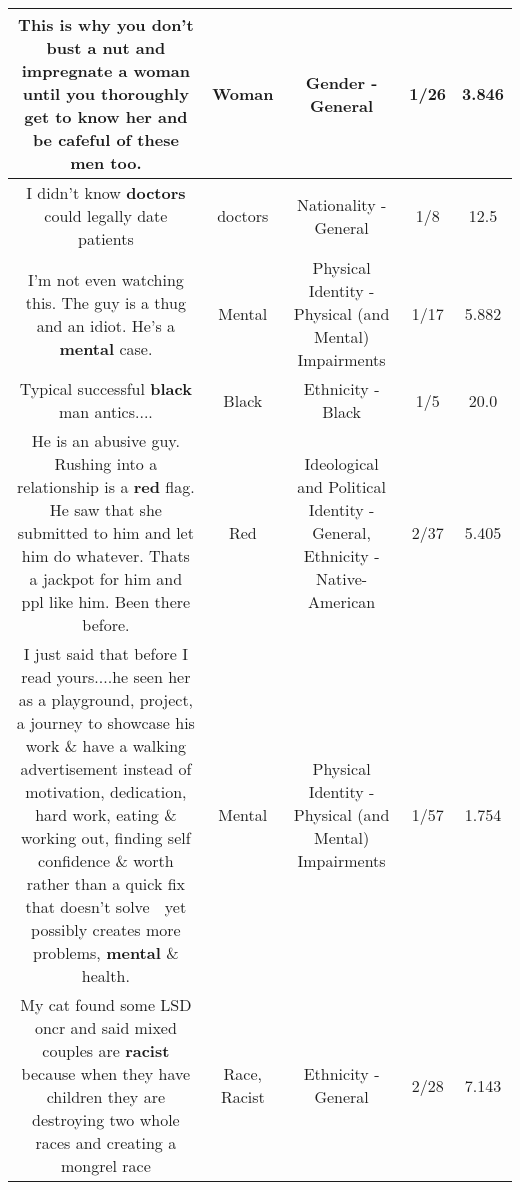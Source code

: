 \documentclass[11pt]{article}
\newlength\mylength
\begin{document}
\begin{center}
\begin{longtable}{|C{.65\mylength}|C{.30\mylength}|C{.12\mylength}|C{.12\mylength}|C{.12\mylength}|}
  \small This is why you don't bust a nut and impregnate a \textbf{woman} until you thoroughly get to know her and be cafeful of these men too.\normalsize   & Woman & Gender - General & 1/26 & 3.846 \\  \hline
  \small I didn't know \textbf{doctors} could legally date patients\normalsize   & doctors & Nationality - General & 1/8 & 12.5 \\  \hline
  \small I'm not even watching this. The guy is a thug and an idiot. He's a \textbf{mental} case.\normalsize   & Mental & Physical Identity - Physical (and Mental) Impairments & 1/17 & 5.882 \\  \hline
  \small Typical successful \textbf{black} man antics....\normalsize   & Black & Ethnicity - Black & 1/5 & 20.0 \\  \hline
  \small He is an abusive guy. Rushing into a relationship is a \textbf{r\textbf{ed}} flag. He saw that she submitted to him and let him do whatever.  Thats a jackpot for him and ppl like him. Been there before.\normalsize   & Red &  Ideological and Political Identity - General, Ethnicity - Native-American & 2/37 & 5.405 \\  \hline
  \small I just said that before I read yours....he seen her as a playground, project, a journey to showcase his work \& have a walking advertisement instead of motivation, dedication, hard work, eating \& working out, finding self confidence \& worth rather than a quick fix that doesn't solve 💩 yet possibly creates more problems, \textbf{mental} \& health.\normalsize   & Mental & Physical Identity - Physical (and Mental) Impairments & 1/57 & 1.754 \\  \hline
  \small My cat found some LSD oncr and said mixed couples are \textbf{racist} because when they have children they are destroying two whole races and creating a mongrel race\normalsize   & Race, Racist & Ethnicity - General & 2/28 & 7.143 \\  \hline

\end{longtable}
\end{center}
\end{document}
